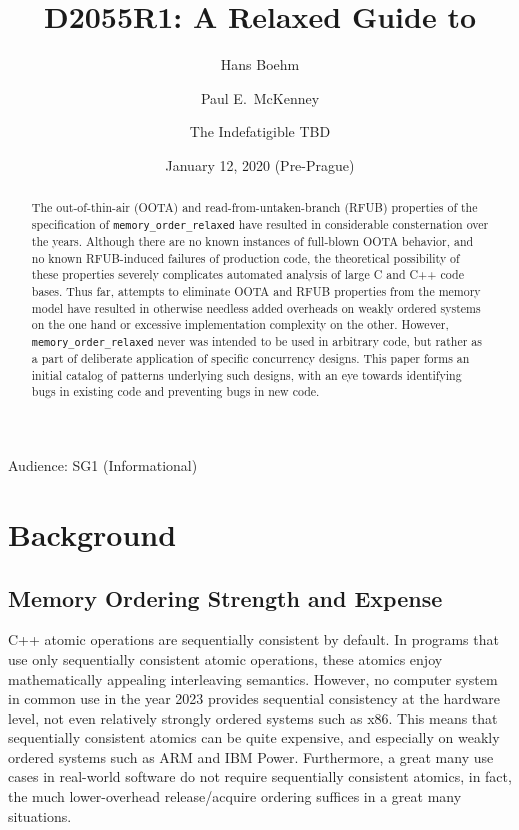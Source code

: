 \documentclass[10]{article}
\begin{document}
\title{D2055R1: A Relaxed Guide to }

\newcommand{\co}[1]{\lstinline[breaklines=yes,breakatwhitespace=yes]{#1}}

\author{
Hans Boehm\\ \and
Paul E.~McKenney\\ \and
The Indefatigible TBD
}
\date{January 12, 2020 (Pre-Prague)}
\maketitle{}

Audience: SG1 (Informational)

\begin{abstract}
	The out-of-thin-air (OOTA) and read-from-untaken-branch (RFUB)
	properties of the specification of \co{memory_order_relaxed}
	have resulted in considerable consternation over the years.
	Although there are no known instances of full-blown OOTA
	behavior, and no known RFUB-induced failures of production code,
	the theoretical possibility of these properties severely
	complicates automated analysis of large C and C++ code bases.
	Thus far, attempts to eliminate OOTA and RFUB properties from
	the memory model have resulted in otherwise needless added
	overheads on weakly ordered systems on the one hand or
	excessive implementation complexity on the other.
	However, \co{memory_order_relaxed} never was intended to be used
	in arbitrary code, but rather as a part of deliberate application
	of specific concurrency designs.
	This paper forms an initial catalog of patterns underlying such
	designs, with an eye towards identifying bugs in existing code
	and preventing bugs in new code.
\end{abstract}

\section{Background}
\label{sec:Background}

\subsection{Memory Ordering Strength and Expense}
\label{sec:Memory Ordering Strength and Expense}

C++ atomic operations are sequentially consistent by default.
In programs that use only sequentially consistent atomic operations,
these atomics enjoy mathematically appealing interleaving semantics.
However, no computer system in common use in the year 2023 provides
sequential consistency at the hardware level, not even relatively
strongly ordered systems such as x86.
This means that sequentially consistent atomics can be quite expensive,
and especially on weakly ordered systems such as ARM and IBM Power.
Furthermore, a great many use cases in real-world software do not
require sequentially consistent atomics, in fact, the much lower-overhead
release/acquire ordering suffices in a great many situations.
\end{document}

